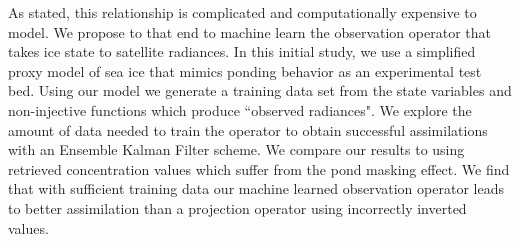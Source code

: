 \par As stated, this relationship is complicated and computationally expensive to model. We propose to that end to machine learn the observation operator that takes ice state to satellite radiances. In this initial study, we use a simplified proxy model of sea ice that mimics ponding behavior as an experimental test bed. Using our model we generate a training data set from the state variables and non-injective functions which produce ``observed radiances". We explore the amount of data needed to train the operator to obtain successful assimilations with an Ensemble Kalman Filter scheme. We compare our results to using retrieved concentration values which suffer from the pond masking effect. We find that with sufficient training data our machine learned observation operator leads to better assimilation than a projection operator using incorrectly inverted values. 

\clearpage
